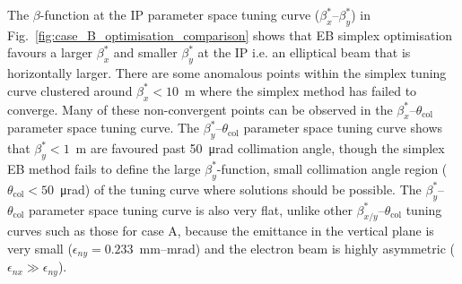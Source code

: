 \documentclass[../main.tex]{subfiles}
\begin{document}
The $\beta$-function at the IP parameter space tuning curve ($\beta_{x}^{*}$--$\beta_{y}^{*}$) in Fig.~\ref{fig:case_B_optimisation_comparison} shows that EB simplex optimisation favours a larger $\beta_{x}^{*}$ and smaller $\beta_{y}^{*}$ at the IP i.e. an elliptical beam that is horizontally larger. There are some anomalous points within the simplex tuning curve clustered around $\beta_{x}^{*} < 10$~\si{\meter} where the simplex method has failed to converge. Many of these non-convergent points can be observed in the $\beta_{x}^{*}$--$\theta_{\mathrm{col}}$ parameter space tuning curve. The $\beta_{y}^{*}$--$\theta_{\mathrm{col}}$ parameter space tuning curve shows that $\beta_{y}^{*} < 1$~\si{\meter} are favoured past 50~\si{\micro\radian} collimation angle, though the simplex EB method fails to define the large $\beta_{y}^{*}$-function, small collimation angle region ($\theta_{\mathrm{col}} < 50$~\si{\micro\radian}) of the tuning curve where solutions should be possible. The $\beta_{y}^{*}$--$\theta_{\mathrm{col}}$ parameter space tuning curve is also very flat, unlike other $\beta_{x/y}^{*}$--$\theta_{\mathrm{col}}$ tuning curves such as those for case A, because the emittance in the vertical plane is very small ($\epsilon_{ny} = 0.233$~\si{\milli\meter}--\si{\milli\radian}) and the electron beam is highly asymmetric ($\epsilon_{nx} \gg \epsilon_{ny}$).
\end{document}

